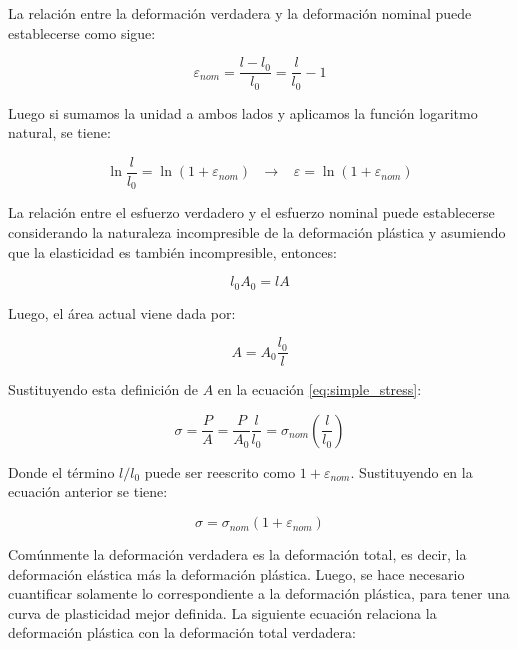 La relación entre la deformación verdadera y la deformación nominal puede establecerse como sigue:

\begin{equation}
\varepsilon_{nom} = \frac{l - l_0}{l_0} = \frac{l}{l_0} - 1
\end{equation} 

Luego si sumamos la unidad a ambos lados y aplicamos la función logaritmo natural, se tiene:

\begin{equation}\label{eq:true_strain}
\ln{\frac{l}{l_0}} = \ln(1 + \varepsilon_{nom}) \,\,\,\,  \rightarrow \,\,\,\,\, 
\varepsilon = \ln(1 + \varepsilon_{nom}) 
\end{equation}

La relación entre el esfuerzo verdadero y el esfuerzo nominal puede establecerse considerando 
la naturaleza incompresible de la deformación plástica y asumiendo que la elasticidad es 
también incompresible, entonces:

\begin{equation}
l_0 A_0 = l A
\end{equation}

Luego, el área actual viene dada por:

\begin{equation}
A = A_0 \frac{l_0}{l}
\end{equation}

Sustituyendo esta definición de $A$ en la ecuación \ref{eq:simple_stress}:

\begin{equation}
\sigma = \frac{P}{A} = \frac{P}{A_0} \frac{l}{l_0} = \sigma_{nom} \left( \frac{l}{l_0} \right)
\end{equation}

Donde el término $l/l_0$  puede ser reescrito como $1 + \varepsilon_{nom}$. Sustituyendo 
en la ecuación anterior se tiene:

\begin{equation} \label{eq:true_stress}
\sigma = \sigma_{nom} ( 1 + \varepsilon_{nom} )
\end{equation}

Comúnmente la deformación verdadera es la deformación total, es decir, la deformación elástica más 
la deformación plástica. Luego, se hace necesario cuantificar solamente lo correspondiente a la 
deformación plástica, para tener una curva de plasticidad mejor definida. La siguiente ecuación 
relaciona la deformación plástica con la deformación total verdadera: ~\cite{abaqus-gs-manual}

